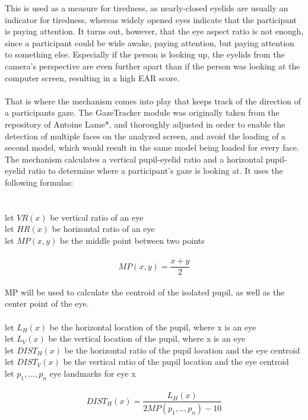 \documentclass{article}
\begin{document}
This is used as a measure for tiredness, as nearly-closed eyelids are usually an indicator for tiredness, whereas widely opened eyes indicate that the participant is paying attention.
It turns out, however, that the eye aspect ratio is not enough, since a participant could be wide awake, paying attention, but paying attention to something else. Especially if the person is looking up, the eyelids from the camera’s perspective are even further apart than if the person was looking at the computer screen, resulting in a high EAR score.\\
\\
That is where the mechanism comes into play that keeps track of the direction of a participants gaze. The GazeTracker module was originally taken from the repository of Antoine Lame*, and thoroughly adjusted in order to enable the detection of multiple faces on the analyzed screen, and avoid the loading of a second model, which would result in the same model being loaded for every face. The mechanism calculates a vertical pupil-eyelid ratio and a horizontal pupil-eyelid ratio to determine where a participant’s gaze is looking at. It uses the following formulas:\\
\\
\\
let $VR(x)$ be vertical ratio of an eye\\
let $HR(x)$ be horizontal ratio of an eye\\
let $MP(x,y)$ be the middle point between two points\\
\\
\begin{equation}
MP(x,y) = \frac{x+y}{2}
\end{equation}
\\
MP will be used to calculate the centroid of the isolated pupil, as well as the center point of the eye.\\
\\
let $L_H(x)$ be the horizontal location of the pupil, where x is an eye\\
let $L_V(x)$ be the vertical location of the pupil, where x is an eye\\
let $DIST_H(x)$ be the horizontal ratio of the pupil location and the eye centroid\\
let $DIST_V(x)$ be the vertical ratio of the pupil location and the eye centroid\\
let $ p_1,...,p_n$ eye landmarks for eye x\\
\\
\begin{equation}
DIST_H(x) = \frac{L_H(x)}{2MP(p_1,..,p_n)-10}
\end{equation}
\end{document}
